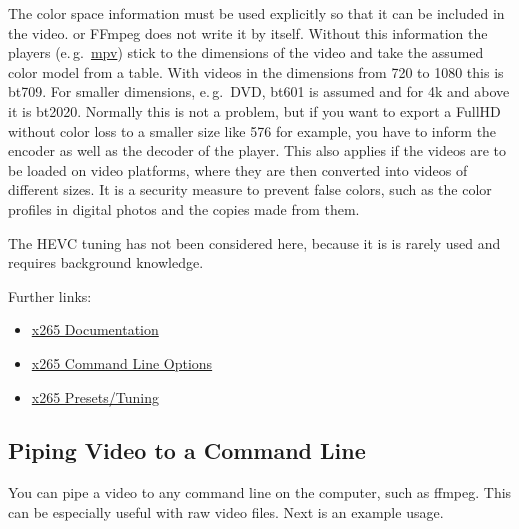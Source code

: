 The color space information must be used explicitly so that it can
be included in the video. \CGG{} or FFmpeg does not write it
by itself. Without this information the players (e.\,g.\ \href{https://mpv.io/}{mpv}) stick to the dimensions of the video and take the assumed color model from a table. With videos in the dimensions from 720 to 1080 this is bt709. For smaller dimensions, e.\,g.\ DVD, bt601 is assumed and for 4k and above it is bt2020. Normally this is not a problem, but if you want to export a FullHD without color loss to a smaller size like 576 for example, you have to inform the encoder as well as the decoder of the player. This also applies if the videos are to be loaded on video platforms, where they are then converted into videos of different sizes. It is a security measure to prevent false colors, such as the color profiles in digital photos and the copies made from them.

The HEVC tuning has not been considered here, because it is is
rarely used and requires background knowledge.

Further links:
\begin{itemize}
    \item \href{http://x265.readthedocs.org/en/default/}{x265
        Documentation}
    \item \href{http://x265.readthedocs.org/en/latest/cli.html}{x265
        Command Line Options}
    \item \href{http://x265.readthedocs.org/en/latest/presets.html}{x265
        Presets/Tuning}
\end{itemize}

\subsection{Piping Video to a Command Line}%
\label{sub:piping_video_command_line}

You can pipe a video to any command line on the computer, such as ffmpeg.  This can be especially useful with raw video files.  Next is an example usage.

